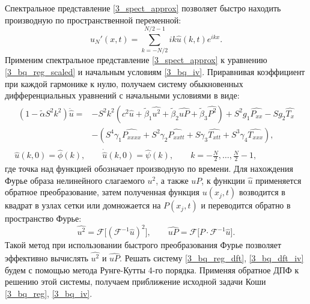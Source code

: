 \documentclass[12pt, a4paper]{report}
\newcommand{\lb}{\left (}
\newcommand{\rb}{\right )}
\begin{document}
Спектральное представление \eqref{3_spect_approx} позволяет быстро находить производную по пространственной переменной:
\begin{equation}\label{3_spect_deriv}
u_N'(x, t) = \sum_{k=-N/2}^{N/2-1} ik \widehat u(k, t) e^{ikx}.
\end{equation}
Применим спектральное представление \eqref{3_spect_approx} к уравнению \eqref{3_bq_reg_scaled} и начальным условиям \eqref{3_bq_iv}. Приравнивая коэффициент при каждой гармонике к нулю, получаем систему обыкновенных дифференциальных уравнений с начальными условиями в виде:
\begin{gather}\label{3_bq_reg_dft}
\begin{split}
\lb 1 - \tilde{\alpha} S^2 k^2\rb\ddot{\widehat u} =&  -S^2 k^2 \lb c^2 \widehat u + \tilde \beta_1 \widehat{u^2} + \tilde\beta_2\widehat{uP} + \tilde{\beta}_3\widehat{P^2} \rb + S^2 g_1 \widehat{P_{xx}} - S g_2 \widehat{T_x} \\
&- \lb S^4\gamma_1 \widehat{P_{xxxx}} + S^2\gamma_2 \widehat{P_{xxtt}} + S\gamma_3 \widehat{T_{xtt}} + S^3\gamma_4 \widehat{T_{xxx}}\rb,
\end{split}\\
\label{3_bq_dft_iv}
\widehat{u}(k, 0) = \widehat{\phi}(k), \qquad \dot{\widehat{u}}(k, 0) = \widehat{\psi}(k), \qquad k=-\frac N 2, \dots, \frac N 2 - 1,
\end{gather}
где точка над функцией обозначает производную по времени.
Для нахождения Фурье образа нелинейного слагаемого $u^2$, а также $uP$, к функции $\widehat u$ применяется обратное преобразование, затем полученная функция $u(x_j, t)$ возводится в квадрат в узлах сетки или домножается на $P(x_j, t)$ и переводится обратно в пространство Фурье:
$$
\widehat{u^2} = \mathcal{F}\lbrack\lb\mathcal{F}^{-1}\widehat u\rb^2\rbrack, \qquad \widehat{uP} = \mathcal{F}\lbrack P\cdot \mathcal{F}^{-1}\widehat u\rbrack.
$$
Такой метод при использовании быстрого преобразования Фурье позволяет эффективно вычислять $\widehat{u^2}$ и $\widehat{uP}$.
Решать систему \eqref{3_bq_reg_dft}, \eqref{3_bq_dft_iv} будем с помощью метода Рунге-Кутты 4-го порядка. Применяя обратное ДПФ к решению этой системы, получаем приближение исходной задачи Коши \eqref{3_bq_reg}, \eqref{3_bq_iv}.
\end{document}

